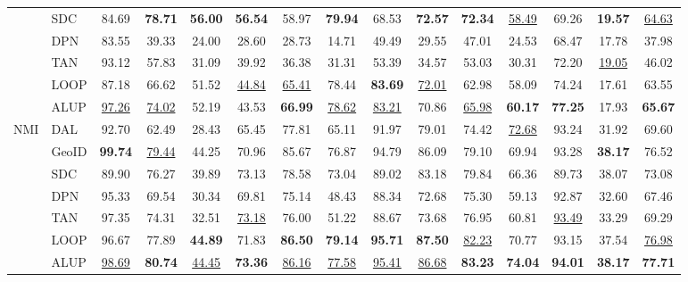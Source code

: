 \begin{tabular}{llccccccccccccc}
&SDC&84.69&\textbf{78.71}&\textbf{56.00}&\textbf{56.54}&58.97&\textbf{79.94}&68.53&\textbf{72.57}&\textbf{72.34}&\underline{58.49}&69.26&\textbf{19.57}&\underline{64.63}\\
&DPN&83.55&39.33&24.00&28.60&28.73&14.71&49.49&29.55&47.01&24.53&68.47&17.78&37.98\\
&TAN&93.12&57.83&31.09&39.92&36.38&31.31&53.39&34.57&53.03&30.31&72.20&\underline{19.05}&46.02\\
&LOOP&87.18&66.62&51.52&\underline{44.84}&\underline{65.41}&78.44&\textbf{83.69}&\underline{72.01}&62.98&58.09&74.24&17.61&63.55\\
&ALUP&\underline{97.26}&\underline{74.02}&52.19&43.53&\textbf{66.99}&\underline{78.62}&\underline{83.21}&70.86&\underline{65.98}&\textbf{60.17}&\textbf{77.25}&17.93&\textbf{65.67}\\
\cline{1-15}
\multirow[t]{7}{*}{NMI}&DAL&92.70&62.49&28.43&65.45&77.81&65.11&91.97&79.01&74.42&\underline{72.68}&93.24&31.92&69.60\\
&GeoID&\textbf{99.74}&\underline{79.44}&44.25&70.96&85.67&76.87&94.79&86.09&79.10&69.94&93.28&\textbf{38.17}&76.52\\
&SDC&89.90&76.27&39.89&73.13&78.58&73.04&89.02&83.18&79.84&66.36&89.73&38.07&73.08\\
&DPN&95.33&69.54&30.34&69.81&75.14&48.43&88.34&72.68&75.30&59.13&92.87&32.60&67.46\\
&TAN&97.35&74.31&32.51&\underline{73.18}&76.00&51.22&88.67&73.68&76.95&60.81&\underline{93.49}&33.29&69.29\\
&LOOP&96.67&77.89&\textbf{44.89}&71.83&\textbf{86.50}&\textbf{79.14}&\textbf{95.71}&\textbf{87.50}&\underline{82.23}&70.77&93.15&37.54&\underline{76.98}\\
&ALUP&\underline{98.69}&\textbf{80.74}&\underline{44.45}&\textbf{73.36}&\underline{86.16}&\underline{77.58}&\underline{95.41}&\underline{86.68}&\textbf{83.23}&\textbf{74.04}&\textbf{94.01}&\textbf{38.17}&\textbf{77.71}\\
\cline{1-15}
\bottomrule
\end{tabular}
